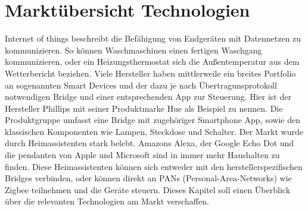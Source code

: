 \chapter{Marktübersicht Technologien}

\grqq Internet of things\grqq{} beschreibt die Befähigung von Endgeräten mit Datennetzen zu kommunizieren. So können Waschmaschinen einen fertigen Waschgang kommunizieren,
oder ein Heizungsthermostat sich die Außentemperatur aus dem Wetterbericht beziehen. Viele Hersteller haben mittlerweile ein breites Portfolio an sogenannten \grqq Smart Devices \grqq{} und der dazu
je nach Übertragunsprotokoll notwendigen \grqq Bridge\grqq{} und einer entsprechenden App zur Steuerung. Hier ist der Hersteller Phillips mit seiner Produktmarke \grqq Hue\grqq{}
als Beispiel zu nennen. Die Produktgruppe umfasst eine Bridge mit zugehöriger Smartphone App, sowie den klassischen Komponenten wie Lampen, Steckdose und Schalter.
Der Markt wurde durch Heimassistenten stark belebt. Amazons Alexa, der Google Echo Dot und die pendanten von Apple und Microsoft sind in immer mehr Haushalten zu finden.
Diese Heimassistenten können sich entweder mit den herstellerspezifischen Bridges verbinden, oder können direkt an PANs (Personal-Area-Networks) wie Zigbee
teilnehmen und die Geräte steuern. Dieses Kapitel soll einen Überblick über die relevanten Technologien am Markt verschaffen. 

